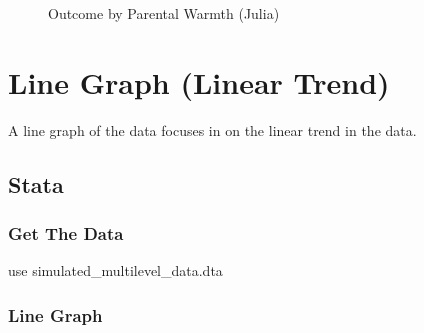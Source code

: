 \documentclass[
  letterpaper,
  DIV=11,
  numbers=noendperiod]{scrreprt}
\newenvironment{Shaded}{\begin{snugshade}}{\end{snugshade}}
\newcommand{\KeywordTok}[1]{\textcolor[rgb]{0.00,0.23,0.31}{#1}}
\newcommand{\NormalTok}[1]{\textcolor[rgb]{0.00,0.23,0.31}{#1}}
\begin{document}
\begin{figure}[H]


\caption{\label{fig-Julia}Outcome by Parental Warmth (Julia)}

\end{figure}%

\section{Line Graph (Linear Trend)}\label{line-graph-linear-trend}

A line graph of the data focuses in on the linear trend in the data.

\subsection{Stata}

\subsubsection{Get The Data}\label{get-the-data-3}

\begin{Shaded}
\begin{Highlighting}[]

\KeywordTok{use}\NormalTok{ simulated\_multilevel\_data.dta}
\end{Highlighting}
\end{Shaded}

\subsubsection{Line Graph}\label{line-graph}
\end{document}
